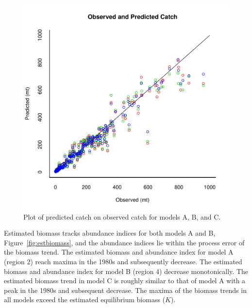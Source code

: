 \documentclass[12pt,letterpaper]{article}
\begin{document}
\begin{figure}
\begin{center}
\includegraphics[height=0.45\textheight]{./4-gear-runs_multiOPcatch.pdf}
\caption{Plot of predicted catch on observed catch for models A, B,
and C.
\label{fig:mopcatch}
}
\end{center}
\end{figure}

Estimated biomass tracks abundance indices for both models A and B,
Figure~\ref{fig:estbiomass}, and the abundance indices lie within the
process error of the biomass trend.
The estimated biomass and abundance index for model A (region 2)
reach maxima in the 1980s and subsequently decrease. 
The estimated biomass and abundance index for model B (region 4) 
decrease monotonically.
The estimated biomass trend in model C is roughly similar to
that of model A with a peak in the 1980s and subsequent decrease.  
The maxima of the biomass trends in all models exceed the
estimated equilibrium biomass ($K$).
\end{document}
